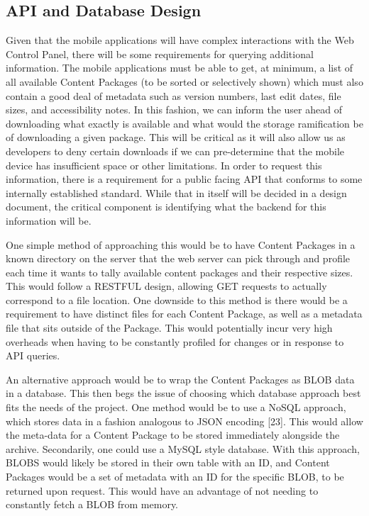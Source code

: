 \documentclass[letterpaper, 10pt,titlepage]{article}
\begin{document}
\subsection{API and Database Design}
Given that the mobile applications will have complex interactions with the Web Control Panel, there will be some requirements for querying additional information. The mobile applications must be able to get, at minimum, a list of all available Content Packages (to be sorted or selectively shown) which must also contain a good deal of metadata such as version numbers, last edit dates, file sizes, and accessibility notes. In this fashion, we can inform the user ahead of downloading what exactly is available and what would the storage ramification be of downloading a given package. This will be critical as it will also allow us as developers to deny certain downloads if we can pre-determine that the mobile device has insufficient space or other limitations. In order to request this information, there is a requirement for a public facing API that conforms to some internally established standard. While that in itself will be decided in a design document, the critical component is identifying what the backend for this information will be.


One simple method of approaching this would be to have Content Packages in a known directory on the server that the web server can pick through and profile each time it wants to tally available content packages and their respective sizes. This would follow a RESTFUL design, allowing GET requests to actually correspond to a file location. One downside to this method is there would be a requirement to have distinct files for each Content Package, as well as a metadata file that sits outside of the Package. This would potentially incur very high overheads when having to be constantly profiled for changes or in response to API queries.


An alternative approach would be to wrap the Content Packages as BLOB data in a database. This then begs the issue of choosing which database approach best fits the needs of the project. One method would be to use a NoSQL approach, which stores data in a fashion analogous to JSON encoding [23]. This would allow the meta-data for a Content Package to be stored immediately alongside the archive. Secondarily, one could use a MySQL style database. With this approach, BLOBS would likely be stored in their own table with an ID, and Content Packages would be a set of metadata with an ID for the specific BLOB, to be returned upon request. This would have an advantage of not needing to constantly fetch a BLOB from memory.
\end{document}
